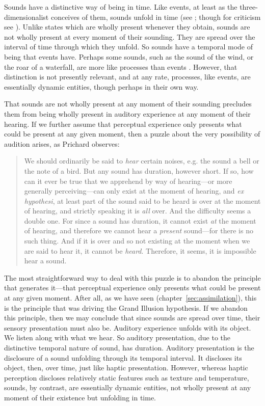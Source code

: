 Sounds have a distinctive way of being in time. Like events, at least as the three-dimensionalist conceives of them, sounds unfold in time (see \citealt{Fine:2006fk}; though for criticism see \citealt{Sider:1997fk,Hawthorne:2008uq}). Unlike states which are wholly present whenever they obtain, sounds are not wholly present at every moment of their sounding. They are spread over the interval of time through which they unfold. So sounds have a temporal mode of being that events have. Perhaps some sounds, such as the sound of the wind, or the roar of a waterfall, are more like processes than events \citep[4]{Broad:1952kx}. However, that distinction is not presently relevant, and at any rate, processes, like events, are essentially dynamic entities, though perhaps in their own way.

That sounds are not wholly present at any moment of their sounding precludes them from being wholly present in auditory experience at any moment of their hearing. If we further assume that perceptual experience only presents what could be present at any given moment, then a puzzle about the very possibility of audition arises, as Prichard observes: 
\begin{quote}
	We should ordinarily be said to \emph{hear} certain noises, e.g. the sound a bell or the note of a bird. But any sound has duration, however short. If so, how can it ever be true that we apprehend by way of hearing---or more generally perceiving---can only exist at the moment of hearing, and \emph{ex hypothesi}, at least part of the sound said to be heard is over at the moment of hearing, and strictly speaking it is \emph{all} over. And the difficulty seems a double one. For since a sound has duration, it cannot exist \emph{at} the moment of hearing, and therefore we cannot hear a \emph{present} sound---for there is no such thing. And if it is over and so not existing at the moment when we are said to hear it, it cannot be \emph{heard}. Therefore, it seems, it is impossible hear a sound. \citep[47]{Prichard:1950ly}
\end{quote}
The most straightforward way to deal with this puzzle is to abandon the principle that generates it---that perceptual experience only presents what could be present at any given moment. After all, as we have seen (chapter~\ref{sec:assimilation}), this is the principle that was driving the Grand Illusion hypothesis. If we abandon this principle, then we may conclude that since sounds are spread over time, their sensory presentation must also be. Auditory experience unfolds with its object. We listen along with what we hear. So auditory presentation, due to the distinctive temporal nature of sound, has duration. Auditory presentation is the disclosure of a sound unfolding through its temporal interval. It discloses its object, then, over time, just like haptic presentation. However, whereas haptic perception discloses relatively static features such as texture and temperature, sounds, by contrast, are essentially dynamic entities, not wholly present at any moment of their existence but unfolding in time. 

